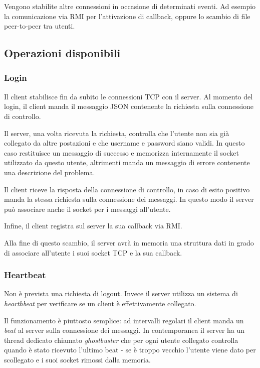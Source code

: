 Vengono stabilite altre connessioni in occasione di determinati eventi. Ad esempio la comunicazione via RMI per l'attivazione di callback, oppure lo scambio di file peer-to-peer tra utenti.
    
\subsection{Operazioni disponibili}
\label{ssec:operazioni}
\subsubsection{Login}
Il client stabilisce fin da subito le connessioni TCP con il server. Al momento del login, il client manda il messaggio JSON contenente la richiesta sulla connessione di controllo.

Il server, una volta ricevuta la richiesta, controlla che l'utente non sia già collegato da altre postazioni e che username e password siano validi. In questo caso restituisce un messaggio di successo e memorizza internamente il socket utilizzato da questo utente, altrimenti manda un messaggio di errore contenente una descrizione del problema.

Il client riceve la risposta della connessione di controllo, in caso di esito positivo manda la stessa richiesta sulla connessione dei messaggi. In questo modo il server può associare anche il socket per i messaggi all'utente.

Infine, il client registra sul server la sua callback via RMI.

Alla fine di questo scambio, il server avrà in memoria una struttura dati in grado di associare all'utente i suoi socket TCP e la sua callback.

\subsubsection{Heartbeat}
Non è prevista una richiesta di logout. Invece il server utilizza un sistema di \textit{hearthbeat} per verificare se un client è effettivamente collegato.

Il funzionamento è piuttosto semplice: ad intervalli regolari il client manda un \textit{beat} al server sulla connessione dei messaggi. In contemporanea il server ha un thread dedicato chiamato \textit{ghostbuster} che per ogni utente collegato controlla quando è stato ricevuto l'ultimo beat - se è troppo vecchio l'utente viene dato per scollegato e i suoi socket rimossi dalla memoria.

